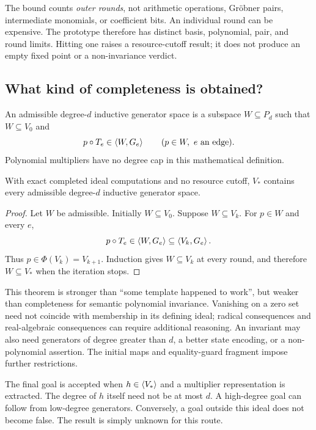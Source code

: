 The bound counts \emph{outer rounds}, not arithmetic operations, Gr\"obner
pairs, intermediate monomials, or coefficient bits. An individual round can be
expensive. The prototype therefore has distinct basis, polynomial, pair, and
round limits. Hitting one raises a resource-cutoff result; it does not produce
an empty fixed point or a non-invariance verdict.

\subsection{What kind of completeness is obtained?}

\begin{definition}
An admissible degree-$d$ inductive generator space is a subspace $W\subseteq P_d$
such that $W\subseteq V_0$ and
\[
 p\circ T_e\in\left\langle W,G_e\right\rangle\qquad(p\in W,\ e\text{ an edge}).
\]
Polynomial multipliers have no degree cap in this mathematical definition.
\end{definition}

\begin{theorem}
With exact completed ideal computations and no resource cutoff, $V_*$ contains
every admissible degree-$d$ inductive generator space.
\end{theorem}
\begin{proof}
Let $W$ be admissible. Initially $W\subseteq V_0$. Suppose $W\subseteq V_k$.
For $p\in W$ and every $e$,
\[
 p\circ T_e\in\left\langle W,G_e\right\rangle\subseteq\left\langle V_k,G_e\right\rangle.
\]
Thus $p\in\Phi(V_k)=V_{k+1}$. Induction gives $W\subseteq V_k$ at every round,
and therefore $W\subseteq V_*$ when the iteration stops.
\end{proof}

This theorem is stronger than ``some template happened to work'', but weaker
than completeness for semantic polynomial invariance. Vanishing on a zero set
need not coincide with membership in its defining ideal; radical consequences
and real-algebraic consequences can require additional reasoning. An invariant
may also need generators of degree greater than $d$, a better state encoding,
or a non-polynomial assertion. The initial maps and equality-guard fragment
impose further restrictions.

The final goal is accepted when $h\in\left\langle V_*\right\rangle$ and a multiplier representation
is extracted. The degree of $h$ itself need not be at most $d$. A high-degree
goal can follow from low-degree generators. Conversely, a goal outside this
ideal does not become false. The result is simply unknown for this route.

